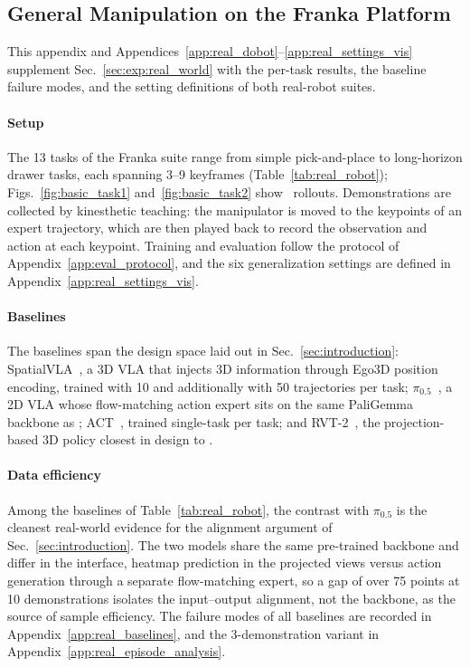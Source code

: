 \subsection{General Manipulation on the Franka Platform}
\label{app:real_franka}

This appendix and
Appendices~\ref{app:real_dobot}--\ref{app:real_settings_vis} supplement
Sec.~\ref{sec:exp:real_world} with the per-task results, the baseline
failure modes, and the setting definitions of both real-robot suites.

\paragraph{Setup}
The 13 tasks of the Franka suite range from simple pick-and-place to
long-horizon drawer tasks, each spanning 3--9 keyframes
(Table~\ref{tab:real_robot}); Figs.~\ref{fig:basic_task1}
and~\ref{fig:basic_task2} show \method\ rollouts.
Demonstrations are collected by kinesthetic teaching: the manipulator
is moved to the keypoints of an expert trajectory, which are then
played back to record the observation and action at each keypoint.
Training and evaluation follow the protocol of
Appendix~\ref{app:eval_protocol}, and the six generalization settings
are defined in Appendix~\ref{app:real_settings_vis}.

\paragraph{Baselines}
The baselines span the design space laid out in
Sec.~\ref{sec:introduction}: SpatialVLA~\cite{qu2025spatialvla}, a 3D
VLA that injects 3D information through Ego3D position encoding,
trained with 10 and additionally with 50 trajectories per task;
$\pi_{0.5}$~\cite{intelligence2025pi_}, a 2D VLA whose flow-matching action
expert sits on the same PaliGemma backbone as \method;
ACT~\cite{zhao2023learning}, trained single-task per task; and
RVT-2~\cite{goyal2024rvt}, the projection-based 3D policy closest in
design to \method.

\paragraph{Data efficiency}
Among the baselines of Table~\ref{tab:real_robot}, the contrast with
$\pi_{0.5}$ is the cleanest real-world evidence for the alignment argument
of Sec.~\ref{sec:introduction}.
The two models share the same pre-trained backbone and differ in the
interface, heatmap prediction in the projected views versus action
generation through a separate flow-matching expert, so a gap of over 75
points at 10 demonstrations isolates the input--output alignment, not
the backbone, as the source of sample efficiency.
The failure modes of all baselines are recorded in
Appendix~\ref{app:real_baselines}, and the 3-demonstration variant in
Appendix~\ref{app:real_episode_analysis}.

